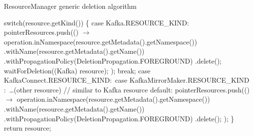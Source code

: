\begin{algorithm}[H]
    \label{02:alg:deletionalg}
    \caption{ResourceManager generic deletion algorithm}
    \begin{algorithmic}[1]
            \State switch(resource.getKind()) \{
            \State \hspace{2em} case Kafka.RESOURCE\_KIND$:$
            \State \hspace{4em} pointerResources.push(() $\rightarrow$ {
                \State \hspace{4em} operation.inNamespace(resource.getMetadata().getNamespace())
                \State \hspace{4em} .withName(resource.getMetadata().getName())
                \State \hspace{4em} .withPropagationPolicy(DeletionPropagation.FOREGROUND)
                \State \hspace{4em} .delete();
                \State \hspace{4em} waitForDeletion((Kafka) resource);
                \State \hspace{2em} });
            \State \hspace{2em} break;
            \State \hspace{2em} case KafkaConnect.RESOURCE\_KIND$:$
            \State \hspace{2em} case KafkaMirrorMaker.RESOURCE\_KIND$:$
            \State \hspace{2em} \dots (other resource)
            \State \hspace{4em} // similar to Kafka resource
            \State \hspace{2em} default:
            \State \hspace{4em}        pointerResources.push(() $\rightarrow$  {
                \State \hspace{4em}           operation.inNamespace(resource.getMetadata().getNamespace())
                \State \hspace{4em}                  .withName(resource.getMetadata().getName())
                \State \hspace{4em}                  .withPropagationPolicy(DeletionPropagation.FOREGROUND)
                \State \hspace{4em}                  .delete();
                \State \hspace{2em}     });
            \State \}
            \State return resource;
        \EndProcedure
    \end{algorithmic}
\end{algorithm}


